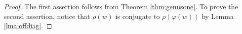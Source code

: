 \documentclass{article}
\theoremstyle{plain}
\theoremstyle{definition}
\theoremstyle{plain}
\theoremstyle{plain}
\theoremstyle{plain}
\theoremstyle{remark}
\theoremstyle{remark}
\theoremstyle{plain}
\theoremstyle{plain}
\begin{document}
\begin{proof}
The first assertion follows from Theorem \ref{thm:genusone}. To prove the second assertion, notice that $\rho(w)$ is conjugate to $\rho(\varphi(w))$ by Lemma \ref{lma:offdiag}.

\end{proof}
\end{document}
